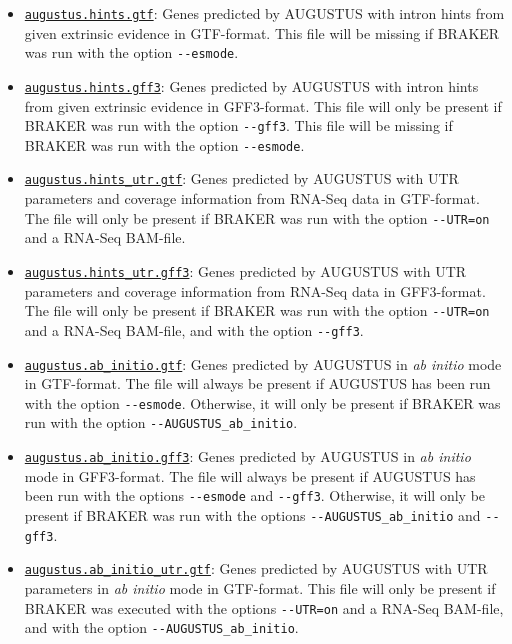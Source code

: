 \documentclass[a4paper,10pt]{report}
\begin{document}
\begin{itemize}
	\item \underline{\texttt{augustus.hints.gtf}}: Genes predicted by AUGUSTUS with intron hints from given extrinsic evidence in GTF-format. This file will be missing if BRAKER was run with the option \texttt{-{}-esmode}.
	
	\item \underline{\texttt{augustus.hints.gff3}}: Genes predicted by AUGUSTUS with intron hints from given extrinsic evidence in GFF3-format. This file will only be present if BRAKER was run with the option \texttt{-{}-gff3}. This file will be missing if BRAKER was run with the option \texttt{-{}-esmode}.
	
	\item \underline{\texttt{augustus.hints\_utr.gtf}}: Genes predicted by AUGUSTUS with UTR parameters and coverage information from RNA-Seq data in GTF-format. The file will only be present if BRAKER was run with the option \texttt{-{}-UTR=on} and a RNA-Seq BAM-file. 
	
	\item \underline{\texttt{augustus.hints\_utr.gff3}}: Genes predicted by AUGUSTUS with UTR parameters and coverage information from RNA-Seq data in GFF3-format. The file will only be present if BRAKER was run with the option \texttt{-{}-UTR=on} and a RNA-Seq BAM-file, and with the option \texttt{-{}-gff3}.
	
	\item \underline{\texttt{augustus.ab\_initio.gtf}}: Genes predicted by AUGUSTUS in \textit{ab initio} mode in GTF-format. The file will always be present if AUGUSTUS has been run with the option \texttt{-{}-esmode}. Otherwise, it will only be present if BRAKER was run with the option \texttt{-{}-AUGUSTUS\_ab\_initio}.
	
	\item \underline{\texttt{augustus.ab\_initio.gff3}}: Genes predicted by AUGUSTUS in \textit{ab initio} mode in GFF3-format. The file will always be present if AUGUSTUS has been run with the options \texttt{-{}-esmode} and \texttt{-{}-gff3}. Otherwise, it will only be present if BRAKER was run with the options \texttt{-{}-AUGUSTUS\_ab\_initio} and \texttt{-{}-gff3}.
	
	\item \underline{\texttt{augustus.ab\_initio\_utr.gtf}}: Genes predicted by AUGUSTUS with UTR parameters in \textit{ab initio} mode in GTF-format. This file will only be present if BRAKER was executed with  the options \texttt{-{}-UTR=on} and a RNA-Seq BAM-file, and with the option \texttt{-{}-AUGUSTUS\_ab\_initio}.
	

\end{itemize}
\end{document}
